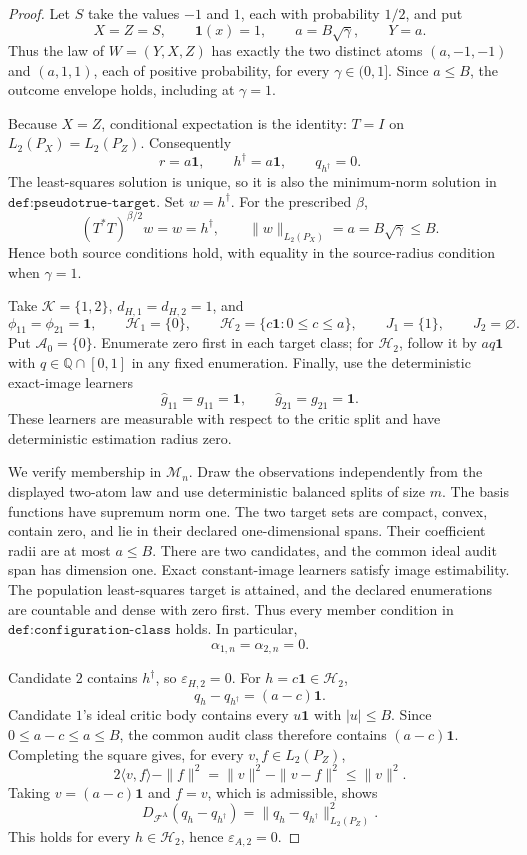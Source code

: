 \begin{proof}
Let \(S\) take the values \(-1\) and \(1\), each with probability \(1/2\), and put
\[
 X=Z=S,\qquad \mathbf 1(x)=1,\qquad
 a=B\sqrt{\gamma},\qquad Y=a.
\]
Thus the law of \(W=(Y,X,Z)\) has exactly the two distinct atoms \((a,-1,-1)\) and \((a,1,1)\), each of positive probability, for every \(\gamma\in(0,1]\). Since \(a\le B\), the outcome envelope holds, including at \(\gamma=1\).

Because \(X=Z\), conditional expectation is the identity: \(T=I\) on \(L_2(P_X)=L_2(P_Z)\). Consequently
\[
 r=a\mathbf 1,
 \qquad h^\dagger=a\mathbf 1,
 \qquad q_{h^\dagger}=0.
\]
The least-squares solution is unique, so it is also the minimum-norm solution in \(\texttt{def:pseudotrue-target}\). Set \(w=h^\dagger\). For the prescribed \(\beta\),
\[
 (T^*T)^{\beta/2}w=w=h^\dagger,
 \qquad
 \|w\|_{L_2(P_X)}=a=B\sqrt\gamma\le B.
\]
Hence both source conditions hold, with equality in the source-radius condition when \(\gamma=1\).

Take \(\mathcal K=\{1,2\}\), \(d_{H,1}=d_{H,2}=1\), and
\[
 \phi_{11}=\phi_{21}=\mathbf 1,
 \qquad
 \mathcal H_1=\{0\},
 \qquad
 \mathcal H_2=\{c\mathbf 1:0\le c\le a\},
 \qquad
 J_1=\{1\},
 \qquad
 J_2=\varnothing.
\]
Put \(\mathcal A_0=\{0\}\). Enumerate zero first in each target class; for \(\mathcal H_2\), follow it by \(a q\mathbf 1\) with \(q\in\mathbb Q\cap[0,1]\) in any fixed enumeration. Finally, use the deterministic exact-image learners
\[
 \widehat g_{11}=g_{11}=\mathbf 1,
 \qquad
 \widehat g_{21}=g_{21}=\mathbf 1.
\]
These learners are measurable with respect to the critic split and have deterministic estimation radius zero.

We verify membership in \(\mathcal M_n\). Draw the observations independently from the displayed two-atom law and use deterministic balanced splits of size \(m\). The basis functions have supremum norm one. The two target sets are compact, convex, contain zero, and lie in their declared one-dimensional spans. Their coefficient radii are at most \(a\le B\). There are two candidates, and the common ideal audit span has dimension one. Exact constant-image learners satisfy image estimability. The population least-squares target is attained, and the declared enumerations are countable and dense with zero first. Thus every member condition in \(\texttt{def:configuration-class}\) holds. In particular,
\[
 \alpha_{1,n}=\alpha_{2,n}=0.
\]

Candidate \(2\) contains \(h^\dagger\), so \(\varepsilon_{H,2}=0\). For \(h=c\mathbf 1\in\mathcal H_2\),
\[
 q_h-q_{h^\dagger}=(a-c)\mathbf 1.
\]
Candidate \(1\)'s ideal critic body contains every \(u\mathbf 1\) with \(|u|\le B\). Since \(0\le a-c\le a\le B\), the common audit class therefore contains \((a-c)\mathbf 1\). Completing the square gives, for every \(v,f\in L_2(P_Z)\),
\[
 2\langle v,f\rangle-\|f\|^2
 =\|v\|^2-\|v-f\|^2
 \le\|v\|^2.
\]
Taking \(v=(a-c)\mathbf 1\) and \(f=v\), which is admissible, shows
\[
 D_{\mathcal F^{\mathrm A}}(q_h-q_{h^\dagger})
 =\|q_h-q_{h^\dagger}\|_{L_2(P_Z)}^2.
\]
This holds for every \(h\in\mathcal H_2\), hence \(\varepsilon_{A,2}=0\).


\end{proof}
